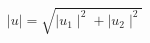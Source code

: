 \begin{equation}
\mid u \mid = \sqrt{\mid u_{1}\mid^{2} + \mid u_{2}\mid^{2}}                                    \label{1.43}
\end{equation}

